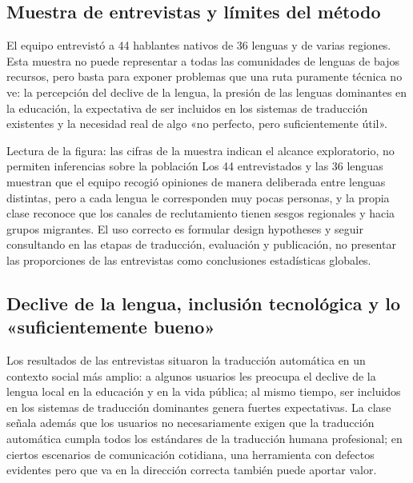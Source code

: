 \subsection{Muestra de entrevistas y límites del método}

El equipo entrevistó a 44 hablantes nativos de 36 lenguas y de varias regiones. Esta muestra no puede representar a todas las comunidades de lenguas de bajos recursos, pero basta para exponer problemas que una ruta puramente técnica no ve: la percepción del declive de la lengua, la presión de las lenguas dominantes en la educación, la expectativa de ser incluidos en los sistemas de traducción existentes y la necesidad real de algo «no perfecto, pero suficientemente útil».


\begin{knowledgebox}{Lectura de la figura: las cifras de la muestra indican el alcance exploratorio, no permiten inferencias sobre la población}
Los 44 entrevistados y las 36 lenguas muestran que el equipo recogió opiniones de manera deliberada entre lenguas distintas, pero a cada lengua le corresponden muy pocas personas, y la propia clase reconoce que los canales de reclutamiento tienen sesgos regionales y hacia grupos migrantes. El uso correcto es formular design hypotheses y seguir consultando en las etapas de traducción, evaluación y publicación, no presentar las proporciones de las entrevistas como conclusiones estadísticas globales.
\end{knowledgebox}


\subsection{Declive de la lengua, inclusión tecnológica y lo «suficientemente bueno»}

Los resultados de las entrevistas situaron la traducción automática en un contexto social más amplio: a algunos usuarios les preocupa el declive de la lengua local en la educación y en la vida pública; al mismo tiempo, ser incluidos en los sistemas de traducción dominantes genera fuertes expectativas. La clase señala además que los usuarios no necesariamente exigen que la traducción automática cumpla todos los estándares de la traducción humana profesional; en ciertos escenarios de comunicación cotidiana, una herramienta con defectos evidentes pero que va en la dirección correcta también puede aportar valor.

